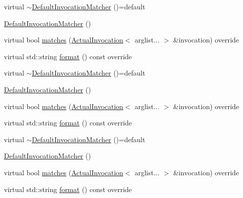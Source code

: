 \begin{DoxyCompactItemize}
\item 
virtual \mbox{\hyperlink{structfakeit_1_1DefaultInvocationMatcher_afa983748ccd4ec5a8293d2621bdc0b76}{$\sim$\+Default\+Invocation\+Matcher}} ()=default
\item 
\mbox{\hyperlink{structfakeit_1_1DefaultInvocationMatcher_ae7aacc110f471b0278cdea99d3e0d287}{Default\+Invocation\+Matcher}} ()
\item 
virtual bool \mbox{\hyperlink{structfakeit_1_1DefaultInvocationMatcher_a6eec95726a684a4dc2498b00e68e8166}{matches}} (\mbox{\hyperlink{structfakeit_1_1ActualInvocation}{Actual\+Invocation}}$<$ arglist... $>$ \&invocation) override
\item 
virtual std\+::string \mbox{\hyperlink{structfakeit_1_1DefaultInvocationMatcher_a056fc7516e51e5eb15831359cb376fef}{format}} () const override
\item 
virtual \mbox{\hyperlink{structfakeit_1_1DefaultInvocationMatcher_afa983748ccd4ec5a8293d2621bdc0b76}{$\sim$\+Default\+Invocation\+Matcher}} ()=default
\item 
\mbox{\hyperlink{structfakeit_1_1DefaultInvocationMatcher_ae7aacc110f471b0278cdea99d3e0d287}{Default\+Invocation\+Matcher}} ()
\item 
virtual bool \mbox{\hyperlink{structfakeit_1_1DefaultInvocationMatcher_a6eec95726a684a4dc2498b00e68e8166}{matches}} (\mbox{\hyperlink{structfakeit_1_1ActualInvocation}{Actual\+Invocation}}$<$ arglist... $>$ \&invocation) override
\item 
virtual std\+::string \mbox{\hyperlink{structfakeit_1_1DefaultInvocationMatcher_a056fc7516e51e5eb15831359cb376fef}{format}} () const override
\item 
virtual \mbox{\hyperlink{structfakeit_1_1DefaultInvocationMatcher_afa983748ccd4ec5a8293d2621bdc0b76}{$\sim$\+Default\+Invocation\+Matcher}} ()=default
\item 
\mbox{\hyperlink{structfakeit_1_1DefaultInvocationMatcher_ae7aacc110f471b0278cdea99d3e0d287}{Default\+Invocation\+Matcher}} ()
\item 
virtual bool \mbox{\hyperlink{structfakeit_1_1DefaultInvocationMatcher_a6eec95726a684a4dc2498b00e68e8166}{matches}} (\mbox{\hyperlink{structfakeit_1_1ActualInvocation}{Actual\+Invocation}}$<$ arglist... $>$ \&invocation) override
\item 
virtual std\+::string \mbox{\hyperlink{structfakeit_1_1DefaultInvocationMatcher_a056fc7516e51e5eb15831359cb376fef}{format}} () const override
\end{DoxyCompactItemize}


